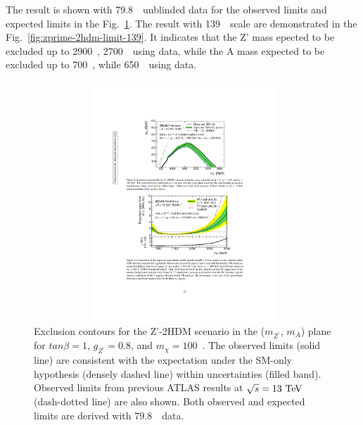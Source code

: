 \par The result is shown with 79.8~\ifb~unblinded data for the observed limits and expected limits in the Fig.~\ref{fig:zprime-2hdm-limit-80}. 
The result with 139~\ifb~scale are demonstrated in the Fig.~\ref{fig:zprime-2hdm-limit-139}. 
It indicates that the Z' mass epected to be excluded up to 2900~\GeV, 2700~\GeV~using data, while the A mass expected to be excluded up to 700~\GeV, while 650~\GeV~using data.

\begin{figure}[!htb]
    \centering
    \includegraphics[width=12cm, height=9cm, trim={6cm 17cm 5.8cm 4.5cm}, clip]{chapters/c9/figures/ZPrime2HDMLimit-80Exp.pdf}
    \caption{Exclusion contours for the Z'-2HDM scenario in the ($m_{Z^{\prime}}$, $m_{A}$) plane for $tan\beta= 1$, $g_{Z^{\prime}}=0.8$, and $m_{\chi}=100$~\GeV. 
    The observed limits (solid line) are consistent with the expectation under the SM-only hypothesis (densely dashed line) within uncertainties (filled band). 
     Observed limits from previous ATLAS results at $\sqrt{s}=13~\text{Te\kern -0.1em V}$ (dash-dotted line) are also shown. Both observed and expected limits are derived with 79.8~\ifb~data.}
    \label{fig:zprime-2hdm-limit-80}
\end{figure}



